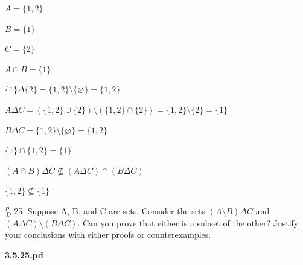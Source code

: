 \documentclass{article}
\begin{document}
$A = \{1,2\}$

$B = \{1\}$

$C = \{2\}$

$A \cap B = \{1\}$

$\{1\} \Delta \{2\} = \{1,2\} \setminus \{\varnothing\} = \{1,2\}$

$A \Delta C = (\{1,2\} \cup \{2\}) \setminus (\{1,2\} \cap \{2\}) = \{1,2\} \setminus \{2\} = \{1\}$

$B \Delta C = \{1,2\} \setminus \{\varnothing\} = \{1,2\}$

$\{1\} \cap \{1,2\} = \{1\}$

$(A \cap B) \Delta C \nsubseteq (A \Delta C) \cap (B \Delta C)$

$\{1,2\} \nsubseteq \{1\}$


\vspace{30pt}

$^{\textit{P}}_{\, \textit{D}}$ 25. Suppose A, B, and C are sets. Consider the sets $(A \setminus B) \Delta C$ and
$(A \Delta C) \setminus (B \Delta C)$. Can you prove that either is a subset of the other?
Justify your conclusions with either proofs or counterexamples.

\vspace{30pt}

\textbf{3.5.25.pd}
\vspace{10pt}
\end{document}
